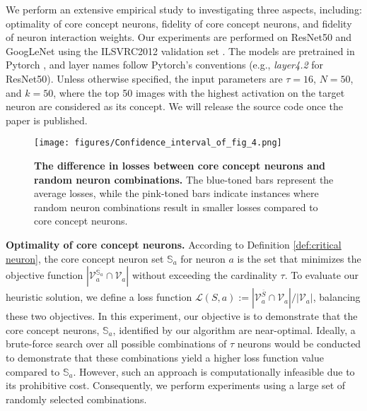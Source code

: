 We perform an extensive empirical study to investigating three aspects, including: optimality of core concept neurons, fidelity of core concept neurons, and fidelity of neuron interaction weights.
Our experiments are performed on ResNet50 \citep{Resnet} and GoogLeNet \cite{Googlenet} using the ILSVRC2012 validation set \citep{Imagenet}. The models are pretrained in Pytorch \citep{Pytorch}, and layer names follow Pytorch's conventions (e.g., \textit{layer4.2} for ResNet50). 
Unless otherwise specified, the input parameters are \( \tau = 16 \), \( N=50 \), and \( k = 50 \), where the top 50 images with the highest activation on the target neuron are considered as its concept. We will release the source code once the paper is published. 

\begin{wrapfigure}{r}{0.55\textwidth}
    \centering
    \vspace{-5mm}
    \texttt{[image: figures/Confidence\_interval\_of\_fig\_4.png]}
    \vspace{-5mm}
    \caption{\textbf{The difference in losses between core concept neurons and random neuron combinations.} The blue-toned bars represent the average losses, while the pink-toned bars indicate instances where random neuron combinations result in smaller losses compared to core concept neurons.}\label{figure2}
    \vspace{-20pt}
\end{wrapfigure}
\noindent \textbf{Optimality of core concept neurons.}
\label{sec:minimization} According to Definition \ref{def:critical neuron}, the core concept neuron set \( \mathbb{S}_a \) for neuron \( a \) is the set that minimizes the objective function \( \left| \mathcal{V}^{\overline{\mathbb{S}_a}}_a \cap \mathcal{V}_a \right| \) without exceeding the cardinality \( \tau \). To evaluate our heuristic solution, we define a loss function \( \mathcal{L}(S, a) := \left| \mathcal{V}^{\overline{S}}_a \cap \mathcal{V}_a \right| / |\mathcal{V}_a| \), balancing these two objectives.
In this experiment, our objective is to demonstrate that the core concept neurons, $\mathbb{S}_a$, identified by our algorithm are near-optimal.
Ideally, a brute-force search over all possible combinations of $\tau$ neurons would be conducted to demonstrate that these combinations yield a higher loss function value compared to $\mathbb{S}_a$. However, such an approach is computationally infeasible due to its prohibitive cost. Consequently, we perform experiments using a large set of randomly selected combinations.

